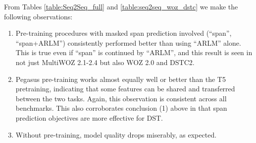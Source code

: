 \documentclass[11pt]{article}
\begin{document}
\begin{table}[htbp]
\small
\centering
    \centering
    \caption{JGA comparison for WOZ 2.0 and DSTC2 datasets on the full history model. Note that our DSTC2 JGAs are likely underreported. While other models use the n-best predictions to evaluate, we only used the single best prediction.}
    \label{table:seq2seq_woz_dstc}
\end{table}

From Tables \ref{table:Seq2Seq_full} and \ref{table:seq2seq_woz_dstc} we make the following observations:
\begin{enumerate}
  \setlength\itemsep{0.0em}
    \item Pre-training procedures with masked span prediction involved (``span'', ``span+ARLM'') consistently performed better than using ``ARLM'' alone. This is true even if ``span'' is continued by ``ARLM'', and this result is seen in not just MultiWOZ 2.1-2.4 but also WOZ 2.0 and DSTC2.
    \item Pegasus pre-training works almost equally well or better than the T5 pretraining, indicating that some features can be shared and transferred between the two tasks. Again, this observation is consistent across all benchmarks. This also corroborates conclusion (1) above in that span prediction objectives are more effective for DST.
    \item Without pre-training, model quality drops miserably, as expected.
\end{enumerate}
\end{document}
